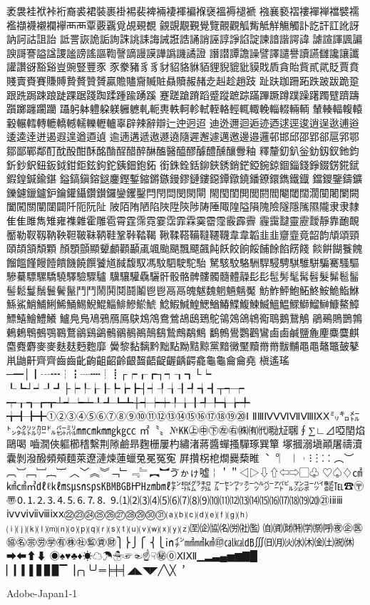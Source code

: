 袤袰袿袱裃裄裔裘裙裝裹褂裼裴裨裲褄褌褊褓襃褞褥褪褫
襁襄褻褶褸襌褝襠襞襦襤襭襪襯襴襷⾑襾覃覈覊覓覘覡覩
覦覬覯覲覺覽覿觀觚觜觝觧觴觸訃訖訐訌訛訝訥訶詁詛詒
詆詈詼詭詬詢誅誂誄誨誡誑誥誦誚誣諄諍諂諚諫諳諧諤諱
謔諠諢諷諞諛謌謇謚諡謖謐謗謠謳鞫謦謫謾謨譁譌譏譎證
譖譛譚譫譟譬譯譴譽讀讌讎讒讓讖讙讚谺豁谿豈豌豎豐⾗
豕豢豬⾘豸豺貂貉貅貊貍貎貔豼貘戝貭貪貽貲貳貮貶賈賁
賤賣賚賽賺賻贄贅贊贇贏贍贐齎贓賍贔贖赧赭赱赳趁趙跂
趾趺跏跚跖跌跛跋跪跫跟跣跼踈踉跿踝踞踐踟蹂踵踰踴蹊
蹇蹉蹌蹐蹈蹙蹤蹠踪蹣蹕蹶蹲蹼躁躇躅躄躋躊躓躑躔躙躪
躡躬躰軆躱躾軅軈軋軛軣軼軻軫軾輊輅輕輒輙輓輜輟輛輌
輦輳輻輹轅轂輾轌轉轆轎轗轜轢轣轤辜辟辣辭辯辷迚迥迢
迪迯邇迴逅迹迺逑逕逡逍逞逖逋逧逶逵逹迸遏遐遑遒逎遉
逾遖遘遞遨遯遶隨遲邂遽邁邀邊邉邏邨邯邱邵郢郤扈郛鄂
鄒鄙鄲鄰酊酖酘酣酥酩酳酲醋醉醂醢醫醯醪醵醴醺釀釁釉
釋釐釖釟釡釛釼釵釶鈞釿鈔鈬鈕鈑鉞鉗鉅鉉鉤鉈銕鈿鉋鉐
銜銖銓銛鉚鋏銹銷鋩錏鋺鍄錮錙錢錚錣錺錵錻鍜鍠鍼鍮鍖
鎰鎬鎭鎔鎹鏖鏗鏨鏥鏘鏃鏝鏐鏈鏤鐚鐔鐓鐃鐇鐐鐶鐫鐵鐡
鐺鑁鑒鑄鑛鑠鑢鑞鑪鈩鑰鑵鑷鑽鑚鑼鑾钁鑿閂閇閊閔閖閘
閙閠閨閧閭閼閻閹閾闊濶闃闍闌闕闔闖關闡闥闢阡阨阮阯
陂陌陏陋陷陜陞陝陟陦陲陬隍隘隕隗險隧隱隲隰隴⾪隶隸
⾫隹雎雋雉雍襍雜霍雕雹霄霆霈霓霎霑霏霖霙霤霪霰霹霽
霾靄靆靈靂靉靜靠靤靦靨勒靫靱靹鞅靼鞁靺鞆鞋鞏鞐鞜鞨
鞦鞣鞳鞴韃韆韈⾱韋韜⾲韭齏韲竟韶韵頏頌頸頤頡頷頽顆
顏顋顫顯顰顱顴顳颪颯颱颶飄飃飆飩飫餃餉餒餔餘餡餝餞
餤餠餬餮餽餾饂饉饅饐饋饑饒饌饕馗馘馥馭馮馼駟駛駝駘
駑駭駮駱駲駻駸騁騏騅駢騙騫騷驅驂驀驃騾驕驍驛驗驟驢
驥驤驩驫驪骭骰骼髀髏髑髓體髞⾽髟髢髣髦髯髫髮髴髱髷
髻鬆鬘鬚鬟鬢鬣⾾鬥鬧鬨鬩鬪鬮⾿鬯鬲⿀魄魃魏魍魎魑魘
魴鮓鮃鮑鮖鮗鮟鮠鮨鮴鯀鯊鮹鯆鯏鯑鯒鯣鯢鯤鯔鯡鰺鯲鯱
鯰鰕鰔鰉鰓鰌鰆鰈鰒鰊鰄鰮鰛鰥鰤鰡鰰鱇鰲鱆鰾鱚鱠鱧鱶
鱸鳧鳬鳰鴉鴈鳫鴃鴆鴪鴦鶯鴣鴟鵄鴕鴒鵁鴿鴾鵆鵈鵝鵞鵤
鵑鵐鵙鵲鶉鶇鶫鵯鵺鶚鶤鶩鶲鷄鷁鶻鶸鶺鷆鷏鷂鷙鷓鷸鷦
鷭鷯鷽鸚鸛鸞⿄鹵鹹鹽麁麈麋麌麒麕麑麝⿆麥麩麸麪麭靡
黌黎黏黐黔黜點黝黠黥黨黯黴黶黷⿋黹黻黼⿌黽鼇鼈皷鼕
鼡鼬鼾齊⿑齒⿒齔齣齟齠齡齦齧齬齪齷齲齶龕龜⿔龠⿕堯
槇遙瑤─━│┃┄┅┆┇┈┉┊┋┌┍┎┏┐┑┒┓└┕
┖┗┘┙┚┛├┝┞┟┠┡┢┣┤┥┦┧┨┩┪┫┬┭┮
┯┰┱┲┳┴┵┶┷┸┹┺┻┼┽┾┿╀╁╂╃╄╅╆╇
╈╉╊╋①②③④⑤⑥⑦⑧⑨⑩⑪⑫⑬⑭⑮⑯⑰⑱⑲⑳Ⅰ
ⅡⅢⅣⅤⅥⅦⅧⅨⅩ㍉㌔㍍㌧㌶㍑㌍㌦㌫㍊㎜㎝㎞㎎㎏㏄
㎡〝〟№㏍㊤㊥㊦㊧㊨㈱㈲㈹㍾㍽㍼∮∑∟⊿啞𨳝焰鷗喝
嚙㵎俠軀櫛𥡴繫荆𨻶鹼昻麴栅屢杓繡渚蔣醬蟬搔驒琢巽簞
塚摑溺塡顚屠禱瀆囊剝潑醱頻頰麵萊遼漣煉蓮蠟兔冕冤𡨚
屛攢柺梎𤏐爨蔾睢︑︒︳︱︲⁝︙⁚︰︵︶︹︺﹇﹈︷︸
︿﹀︽︾﹁﹂﹃﹄︻︼ゔゕゖ噓￤＇＂◁▷⇩⇧⇦⇨▢♧
♡♤♢㎠㎢㎤㎥㎗ℓ㎘㎳㎲㎱㎰㎅㎆㎇㏋㎐㏔㎖㌢㌖㌘㌕
㌃㌣㍗㍂㌹㌻㌀㌱㍇㌞㌪㍿℡☎〶〠🄀⒈⒉⒊⒋⒌⒍⒎⒏
⒐⑴⑵⑶⑷⑸⑹⑺⑻⑼⑽⑾⑿⒀⒁⒂⒃⒄⒅⒆⒇㉑ⅰⅱⅲ
ⅳⅴⅵⅶⅷⅸⅹ㉒㉓㉔㉕㉖㉗㉘㉙㉚㉛⒜⒝⒞⒟⒠⒡⒢⒣
⒤⒥⒦⒧⒨⒩⒪⒫⒬⒭⒮⒯⒰⒱⒲⒳⒴⒵㉃㈽㈿㈴㈸㈳㈼
㉂㈾㈶㈵㈻㉀㈺㊰㊭㊩㊯㊔㊪㊘㊫㊒㊑㊓㊬㊮㊖⎫⎬⎭⎧
⎨⎩㏌㌅㎟㎣㎦㊞㎈㎉㏈∭㈰㈪㈫㈬㈭㈮㈯㈷㉁➡⬅⬆⬇
◉♠♥♣♦☀☁☂☃☞☜☝☟㊙⓪ⅪⅫ▁▂▃▄▅▆▇█
▏▎▍▌▋▊▉▔▕╭╮╰╯═╞╪╡◢◣◥◤╱╲╳︐


Adobe-Japan1-1


